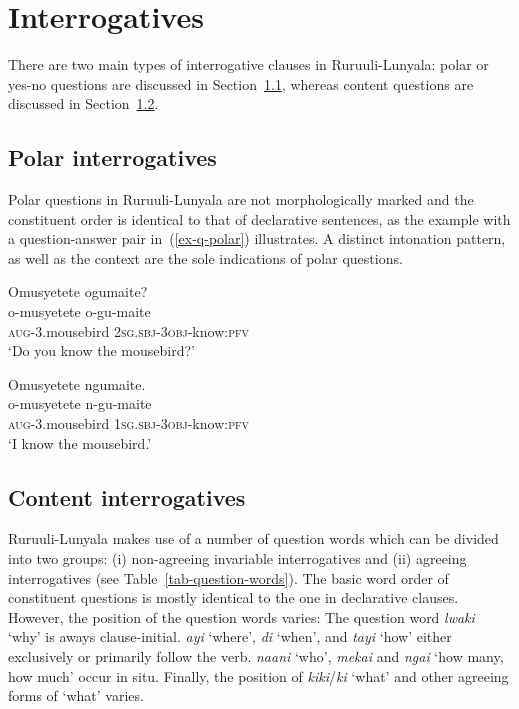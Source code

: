 \section{Interrogatives}\label{sec-interrogatives}

There are two main types of interrogative clauses in Ru\-ruu\-li\hyp{}Lu\-nya\-la: polar or yes-no questions are discussed in Section~\ref{sec-interrogatives-polar}, whereas content questions are discussed in Section~\ref{sec-interrogatives-content}.

\subsection{Polar interrogatives}\label{sec-interrogatives-polar}

Polar questions in Ru\-ruu\-li\hyp{}Lu\-nya\-la are not morphologically marked and the constituent order is identical to that of declarative sentences, as the example with a question-answer pair in~(\ref{ex-q-polar}) illustrates.
A distinct intonation pattern, as well as the context are the sole indications of polar questions.

\ea \label{ex-q-polar}
\begin{xlist}
\ex \label{ex-q-polar-q}
	\glll Omusyetete ogumaite?\\
	 o-musyetete o-gu-maite\\
		\textsc{aug}-3.mousebird 2\textsc{sg.sbj}-\textsc{3obj}-know:\textsc{pfv}\\
	\glt ‘Do you know the mousebird?’

\ex \label{ex-q-polar-a}
	\glll Omusyetete ngumaite.\\
		o-musyetete n-gu-maite\\
	\textsc{aug}-3.mousebird \textsc{1sg.sbj}-\textsc{3obj}-know:\textsc{pfv}\\
	\glt ‘I know the mousebird.’
\end{xlist}
\z


\subsection{Content interrogatives}\label{sec-interrogatives-content}

Ruruuli-Lunyala makes use of a number of question words which can be divided into two groups: 
(i) non-agreeing invariable interrogatives and (ii) agreeing interrogatives (see Table~\ref{tab-question-words}). 
The basic word order of constituent questions is mostly identical to the one in declarative clauses.  However, the position of the question words varies: 
The question word \emph{lwaki} `why' is aways clause-initial. 
\emph{ayi} `where', \emph{di} `when', and \emph{tayi} `how' either exclusively or primarily follow the verb. 
\emph{naani} `who', \emph{mekai} and \emph{ngai} `how many, how much' occur in situ.
Finally, the position of \emph{kiki}/\emph{ki} `what' and other agreeing forms of `what' varies.


